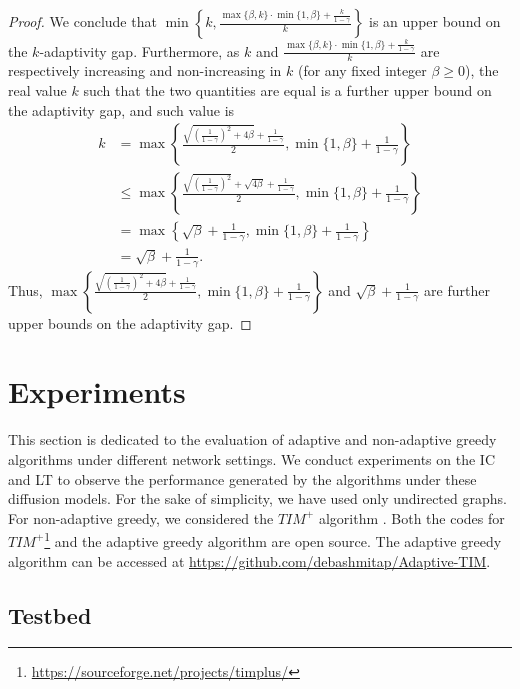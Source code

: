 \begin{proof}
We conclude that $\min\left\{k,\frac{\max\{\beta,k\}\cdot \min\{1,\beta\}+\frac{k}{1-\gamma}}{k}\right\}$ is an upper bound on the $k$-adaptivity gap. Furthermore, as $k$ and $\frac{\max\{\beta,k\}\cdot \min\{1,\beta\}+\frac{k}{1-\gamma}}{k}$ are respectively increasing and non-increasing in $k$ (for any fixed integer $\beta\geq 0$), the real value $k$ such that the two quantities are equal is a further upper bound on the adaptivity gap, and such value is 
\begin{align*}
k&=\max\left\{\frac{\sqrt{\left(\frac{1}{1-\gamma}\right)^2+4\beta}+\frac{1}{1-\gamma}}{2},\min\{1,\beta\}+\frac{1}{1-\gamma}\right\}\\
&\leq  \max\left\{\frac{\sqrt{\left(\frac{1}{1-\gamma}\right)^2}+\sqrt{4\beta}+\frac{1}{1-\gamma}}{2},\min\{1,\beta\}+\frac{1}{1-\gamma}\right\}\\
&=\max\left\{\sqrt{\beta}+\frac{1}{1-\gamma},\min\{1,\beta\}+\frac{1}{1-\gamma}\right\}\\
&= \sqrt{\beta}+\frac{1}{1-\gamma}. 
\end{align*}
Thus, $\max\left\{\frac{\sqrt{\left(\frac{1}{1-\gamma}\right)^2+4\beta}+\frac{1}{1-\gamma}}{2},\min\{1,\beta\}+\frac{1}{1-\gamma}\right\}$ and $\sqrt{\beta}+\frac{1}{1-\gamma}$ are further upper bounds on the adaptivity gap. 

\end{proof}




\section{Experiments} \label{exp}

This section is dedicated to the evaluation of adaptive and non-adaptive greedy algorithms under different network settings. We conduct experiments on the IC and LT to observe the performance generated by the algorithms under these diffusion models. For the sake of simplicity, we have used only undirected graphs. For non-adaptive greedy, we considered the $TIM^+$ algorithm \cite{Tang2014}. Both the codes for $TIM^+$\footnote{\url{https://sourceforge.net/projects/timplus/}} and the adaptive greedy algorithm are open source. The adaptive greedy algorithm can be accessed at \url{https://github.com/debashmitap/Adaptive-TIM}.

\subsection{Testbed}


